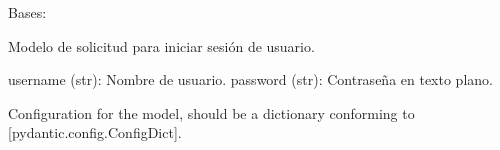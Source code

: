 \documentclass[letterpaper,10pt,spanish]{sphinxmanual}
\begin{document}

\begin{fulllineitems}
\label{\detokenize{endpoints:main.UsuarioLogin}}
\pysigstartsignatures
\pysiglinewithargsret
{}
{\sphinxparamcomma {}\sphinxparamcomma {}}
{}
\pysigstopsignatures
\sphinxAtStartPar
Bases: 

\sphinxAtStartPar
Modelo de solicitud para iniciar sesión de usuario.
\begin{description}
\sphinxAtStartPar
username (str): Nombre de usuario.
password (str): Contraseña en texto plano.

\end{description}

\begin{fulllineitems}
\label{\detokenize{endpoints:main.UsuarioLogin.model_config}}
\pysigstartsignatures
\pysigline
{}
\pysigstopsignatures
\sphinxAtStartPar
Configuration for the model, should be a dictionary conforming to {[}\sphinxtitleref{ConfigDict}{]}{[}pydantic.config.ConfigDict{]}.

\end{fulllineitems}


\begin{fulllineitems}
\label{\detokenize{endpoints:main.UsuarioLogin.password}}
\pysigstartsignatures
\pysigline
{}
\pysigstopsignatures
\end{fulllineitems}


\begin{fulllineitems}
\label{\detokenize{endpoints:main.UsuarioLogin.username}}
\pysigstartsignatures
\pysigline
{}
\pysigstopsignatures
\end{fulllineitems}


\end{fulllineitems}
\end{document}
